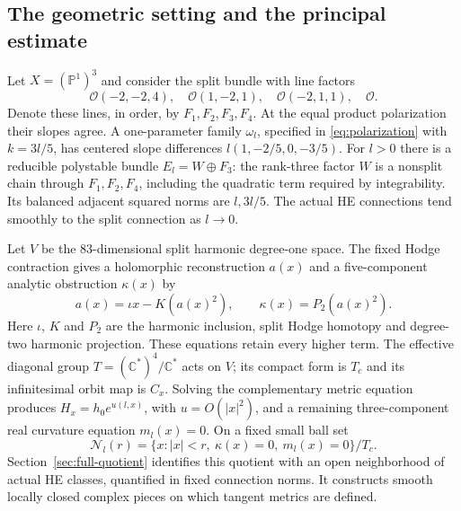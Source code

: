 \documentclass[11pt]{amsart}
\theoremstyle{definition}
\theoremstyle{remark}
\newcommand{\CC}{\mathbb C}
\newcommand{\PP}{\mathbb P}
\newcommand{\cO}{\mathcal O}
\newcommand{\cN}{\mathcal N}
\begin{document}
\subsection{The geometric setting and the principal estimate}
Let $X=(\PP^1)^3$ and consider the split bundle with line factors
\begin{equation}\label{eq:intro-lines}
 \cO(-2,-2,4),\quad\cO(1,-2,1),\quad
 \cO(-2,1,1),\quad\cO.
\end{equation}
Denote these lines, in order, by $F_1,F_2,F_3,F_4$.
At the equal product polarization their slopes agree. A one-parameter
family $\omega_l$, specified in \eqref{eq:polarization} with $k=3l/5$,
has centered slope differences $l(1,-2/5,0,-3/5)$. For $l>0$ there
is a reducible polystable bundle $E_l=W\oplus F_3$: the rank-three
factor $W$ is a nonsplit chain through $F_1,F_2,F_4$, including the
quadratic term required by integrability. Its balanced adjacent
squared norms are $l,3l/5$. The actual HE connections tend smoothly
to the split connection as $l\to0$.

Let $V$ be the $83$-dimensional split harmonic degree-one space.
The fixed Hodge contraction gives a holomorphic reconstruction $a(x)$
and a five-component analytic obstruction $\kappa(x)$ by
\[
 a(x)=\iota x-K(a(x)^2),\qquad \kappa(x)=P_2(a(x)^2).
\]
Here $\iota$, $K$ and $P_2$ are the harmonic inclusion, split Hodge
homotopy and degree-two harmonic projection.
These equations retain every higher term. The effective diagonal group
$T=(\CC^*)^4/\CC^*$ acts on $V$; its compact form is $T_c$ and its
infinitesimal orbit map is $C_x$. Solving the complementary metric
equation produces $H_x=h_0e^{u(l,x)}$, with $u=O(|x|^2)$, and a
remaining three-component real curvature equation $m_l(x)=0$.
On a fixed small ball set
\[
 \cN_l(r)=\{x:|x|<r,\ \kappa(x)=0,\ m_l(x)=0\}/T_c.
\]
Section~\ref{sec:full-quotient} identifies this quotient with an open
neighborhood of actual HE classes, quantified in fixed connection norms.
It constructs smooth locally closed complex pieces on which tangent
metrics are defined.
\end{document}
